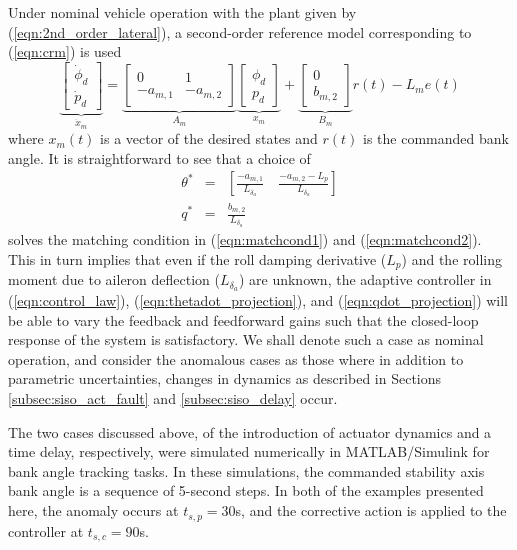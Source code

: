Under nominal vehicle operation with the plant given by (\ref{eqn:2nd_order_lateral}), a second-order reference model corresponding to (\ref{eqn:crm}) is used
\begin{equation}
	\underbrace{\begin{bmatrix}
		\dot{\phi}_d \\ \dot{p}_d
	\end{bmatrix}}_{\dot{x}_m} = \underbrace{\begin{bmatrix}
		0 & 1\\ -a_{m,1} & -a_{m,2}
	\end{bmatrix}}_{A_m} \underbrace{\begin{bmatrix}
		\phi_d \\ p_d
	\end{bmatrix}}_{x_m} + \underbrace{\begin{bmatrix}
		0 \\ b_{m,2}
	\end{bmatrix}}_{B_m} r(t) - L_m e(t)
	\label{eqn:rm_2_symbolic}
\end{equation}
\noindent where $x_m(t)$ is a vector of the desired states and $r(t)$ is the commanded bank angle. It is straightforward to see that a choice of
\begin{eqnarray}
	\theta^* &=& \left[ \frac{-a_{m,1}}{L_{\delta_a}} \quad \frac{-a_{m,2}-L_p}{L_{\delta_a}} \right] \label{e:tstar}\\
	q^* &=& \frac{b_{m,2}}{L_{\delta_a}} \label{e:qstar}
\end{eqnarray} 
\noindent solves the matching condition in (\ref{eqn:matchcond1}) and (\ref{eqn:matchcond2}). This in turn implies that even if the roll damping derivative ($L_p$) and the rolling moment due to aileron deflection ($L_{\delta_a}$) are unknown, the adaptive controller in (\ref{eqn:control_law}), (\ref{eqn:thetadot_projection}), and (\ref{eqn:qdot_projection}) will be able to vary the feedback and feedforward gains such that the closed-loop response of the system is satisfactory. We shall denote such a case as nominal operation, and consider the anomalous cases as those where in addition to parametric uncertainties, changes in dynamics as described in Sections \ref{subsec:siso_act_fault} and \ref{subsec:siso_delay} occur.

The two cases discussed above, of the introduction of actuator dynamics and a time delay, respectively, were simulated numerically in MATLAB/Simulink for bank angle tracking tasks. In these simulations, the commanded stability axis bank angle is a sequence of 5-second steps. In both of the examples presented here, the anomaly occurs at $t_{s,p} = 30$s, and the corrective action is applied to the controller at $t_{s,c} = 90$s.

